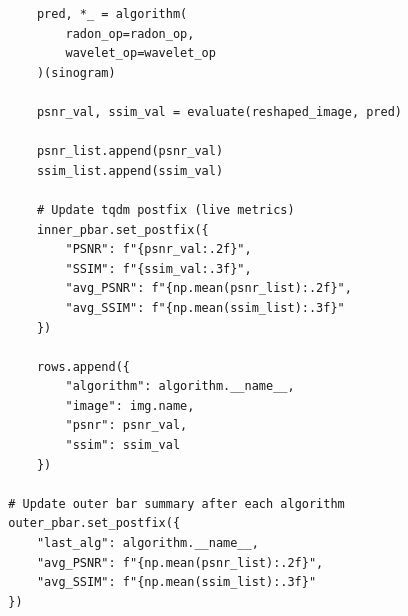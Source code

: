 \begin{verbatim}
            pred, *_ = algorithm(
                radon_op=radon_op,
                wavelet_op=wavelet_op
            )(sinogram)

            psnr_val, ssim_val = evaluate(reshaped_image, pred)

            psnr_list.append(psnr_val)
            ssim_list.append(ssim_val)

            # Update tqdm postfix (live metrics)
            inner_pbar.set_postfix({
                "PSNR": f"{psnr_val:.2f}",
                "SSIM": f"{ssim_val:.3f}",
                "avg_PSNR": f"{np.mean(psnr_list):.2f}",
                "avg_SSIM": f"{np.mean(ssim_list):.3f}"
            })

            rows.append({
                "algorithm": algorithm.__name__,
                "image": img.name,
                "psnr": psnr_val,
                "ssim": ssim_val
            })

        # Update outer bar summary after each algorithm
        outer_pbar.set_postfix({
            "last_alg": algorithm.__name__,
            "avg_PSNR": f"{np.mean(psnr_list):.2f}",
            "avg_SSIM": f"{np.mean(ssim_list):.3f}"
        })
\end{verbatim}